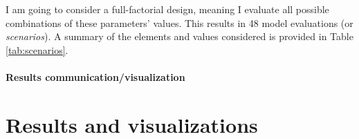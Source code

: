 I am going to consider a full-factorial design, meaning I evaluate all possible combinations of these parameters' values. This results in 48 model evaluations (or \textit{scenarios}). A summary of the elements and values considered is provided in Table \ref{tab:scenarios}.


\begin{table}
    \centering
    \caption{Inputs and values considered for the sensitivity analysis.}
    \label{tab:scenarios}
\end{table}




\paragraph{Results communication/visualization}




\section{Results and visualizations} \label{sec:ch4_res}